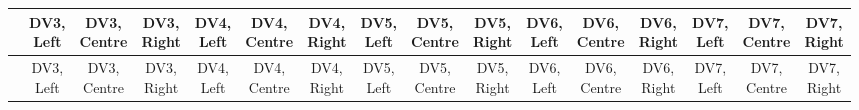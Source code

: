 
\begin{center}
\begin{small}
\begin{longtable}{l@{} c@{} c@{} c@{} c@{} c@{} c@{} c@{} c@{} c@{} c@{} c@{} c@{} c@{} c@{} c@{}}
\hline
 & \shortstack{\rule{0pt}{2.2ex}DV3,\\Left} & \shortstack{\rule{0pt}{2.2ex}DV3,\\Centre} & \shortstack{\rule{0pt}{2.2ex}DV3,\\Right} & \shortstack{\rule{0pt}{2.2ex}DV4,\\Left} & \shortstack{\rule{0pt}{2.2ex}DV4,\\Centre} & \shortstack{\rule{0pt}{2.2ex}DV4,\\Right} & \shortstack{\rule{0pt}{2.2ex}DV5,\\Left} & \shortstack{\rule{0pt}{2.2ex}DV5,\\Centre} & \shortstack{\rule{0pt}{2.2ex}DV5,\\Right} & \shortstack{\rule{0pt}{2.2ex}DV6,\\Left} & \shortstack{\rule{0pt}{2.2ex}DV6,\\Centre} & \shortstack{\rule{0pt}{2.2ex}DV6,\\Right} & \shortstack{\rule{0pt}{2.2ex}DV7,\\Left} & \shortstack{\rule{0pt}{2.2ex}DV7,\\Centre} & \shortstack{\rule{0pt}{2.2ex}DV7,\\Right} \\
\hline
\endfirsthead
\hline
 & \shortstack{\rule{0pt}{2.2ex}DV3,\\Left} & \shortstack{\rule{0pt}{2.2ex}DV3,\\Centre} & \shortstack{\rule{0pt}{2.2ex}DV3,\\Right} & \shortstack{\rule{0pt}{2.2ex}DV4,\\Left} & \shortstack{\rule{0pt}{2.2ex}DV4,\\Centre} & \shortstack{\rule{0pt}{2.2ex}DV4,\\Right} & \shortstack{\rule{0pt}{2.2ex}DV5,\\Left} & \shortstack{\rule{0pt}{2.2ex}DV5,\\Centre} & \shortstack{\rule{0pt}{2.2ex}DV5,\\Right} & \shortstack{\rule{0pt}{2.2ex}DV6,\\Left} & \shortstack{\rule{0pt}{2.2ex}DV6,\\Centre} & \shortstack{\rule{0pt}{2.2ex}DV6,\\Right} & \shortstack{\rule{0pt}{2.2ex}DV7,\\Left} & \shortstack{\rule{0pt}{2.2ex}DV7,\\Centre} & \shortstack{\rule{0pt}{2.2ex}DV7,\\Right} \\

\end{longtable}
\end{small}
\end{center}
